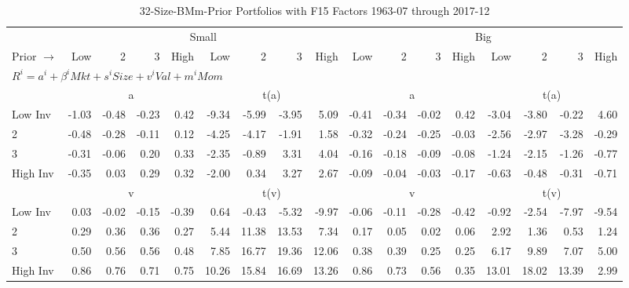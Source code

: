 
\begin{table}[!ht]
\footnotesize
\centering
\caption{32-Size-BMm-Prior Portfolios with F15 Factors 1963-07 through 2017-12}
\begin{tabular}{lrrrrrrrrrrrrrrrr}
  \toprule
    & \multicolumn{8}{c}{Small} & \multicolumn{8}{c}{Big} \\
      \cmidrule(r){2-9} \cmidrule(r){10-17}
    Prior $\rightarrow$ & Low & 2 & 3 & High & Low & 2 & 3 & High & Low & 2 & 3 & High & Low & 2 & 3 & High \\ 
  \midrule
  \multicolumn{17}{l}{$R^i=a^i+\beta^iMkt+s^iSize+v^iVal+m^iMom$} \\

  
    
      & \multicolumn{4}{c}{a} & \multicolumn{4}{c}{t(a)}
    
      & \multicolumn{4}{c}{a} & \multicolumn{4}{c}{t(a)}
    
    \\
      \cmidrule(r){2-5} \cmidrule(r){6-9} \cmidrule(r){10-13} \cmidrule(r){14-17}

    Low Inv   & -1.03  & -0.48  & -0.23  & 0.42  & -9.34  & -5.99  & -3.95  & 5.09  & -0.41  & -0.34  & -0.02  & 0.42  & -3.04  & -3.80  & -0.22  & 4.60  \\
           2  & -0.48  & -0.28  & -0.11  & 0.12  & -4.25  & -4.17  & -1.91  & 1.58  & -0.32  & -0.24  & -0.25  & -0.03  & -2.56  & -2.97  & -3.28  & -0.29  \\
           3  & -0.31  & -0.06  & 0.20  & 0.33  & -2.35  & -0.89  & 3.31  & 4.04  & -0.16  & -0.18  & -0.09  & -0.08  & -1.24  & -2.15  & -1.26  & -0.77  \\
    High Inv  & -0.35  & 0.03  & 0.29  & 0.32  & -2.00  & 0.34  & 3.27  & 2.67  & -0.09  & -0.04  & -0.03  & -0.17  & -0.63  & -0.48  & -0.31  & -0.71  \\

  
    
      & \multicolumn{4}{c}{v} & \multicolumn{4}{c}{t(v)}
    
      & \multicolumn{4}{c}{v} & \multicolumn{4}{c}{t(v)}
    
    \\
      \cmidrule(r){2-5} \cmidrule(r){6-9} \cmidrule(r){10-13} \cmidrule(r){14-17}

    Low Inv   & 0.03  & -0.02  & -0.15  & -0.39  & 0.64  & -0.43  & -5.32  & -9.97  & -0.06  & -0.11  & -0.28  & -0.42  & -0.92  & -2.54  & -7.97  & -9.54  \\
           2  & 0.29  & 0.36  & 0.36  & 0.27  & 5.44  & 11.38  & 13.53  & 7.34  & 0.17  & 0.05  & 0.02  & 0.06  & 2.92  & 1.36  & 0.53  & 1.24  \\
           3  & 0.50  & 0.56  & 0.56  & 0.48  & 7.85  & 16.77  & 19.36  & 12.06  & 0.38  & 0.39  & 0.25  & 0.25  & 6.17  & 9.89  & 7.07  & 5.00  \\
    High Inv  & 0.86  & 0.76  & 0.71  & 0.75  & 10.26  & 15.84  & 16.69  & 13.26  & 0.86  & 0.73  & 0.56  & 0.35  & 13.01  & 18.02  & 13.39  & 2.99  \\


\end{tabular}
\end{table}
